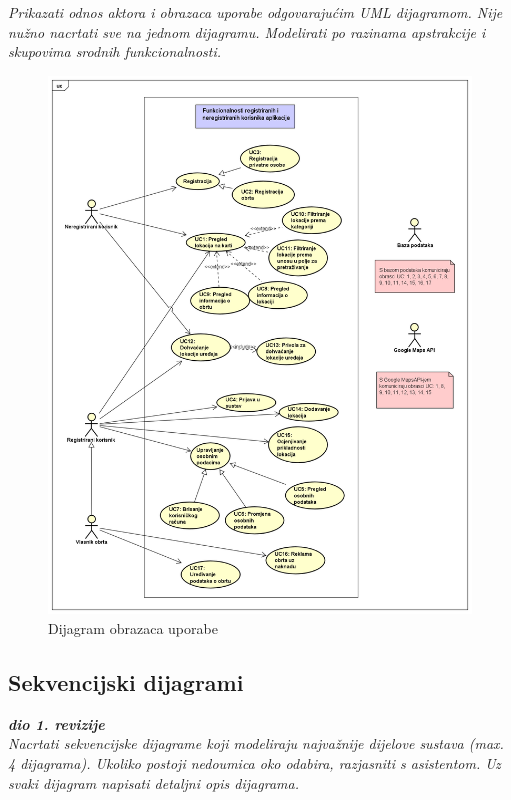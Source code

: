 					\textit{Prikazati odnos aktora i obrazaca uporabe odgovarajućim UML dijagramom. Nije nužno nacrtati sve na jednom dijagramu. Modelirati po razinama apstrakcije i skupovima srodnih funkcionalnosti.}
					\begin{figure}[H]
						\includegraphics[scale=1.2]{slike/UseCaseDiagram2.png}
						\centering
						\caption{Dijagram obrazaca uporabe}
						\label{fig:promjene}
					\end{figure}
				\eject		
				
			\subsection{Sekvencijski dijagrami}
				
				\textbf{\textit{dio 1. revizije}}\\
				
				\textit{Nacrtati sekvencijske dijagrame koji modeliraju najvažnije dijelove sustava (max. 4 dijagrama). Ukoliko postoji nedoumica oko odabira, razjasniti s asistentom. Uz svaki dijagram napisati detaljni opis dijagrama.}
				
